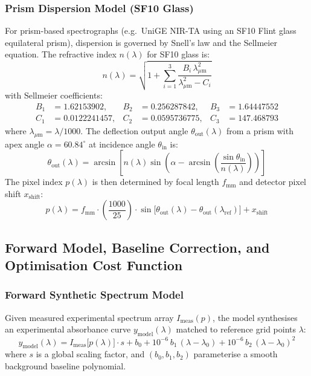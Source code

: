\subsubsection{Prism Dispersion Model (SF10 Glass)}
For prism-based spectrographs (e.g.\ UniGE NIR-TA using an SF10 Flint glass equilateral prism), dispersion is governed by Snell's law and the Sellmeier equation. The refractive index $n(\lambda)$ for SF10 glass is:
\begin{equation}\label{eq:sellmeier}
  n(\lambda) = \sqrt{1 + \sum_{i=1}^{3} \frac{B_i \, \lambda_{\mu\text{m}}^2}{\lambda_{\mu\text{m}}^2 - C_i}}
\end{equation}
with Sellmeier coefficients:
\begin{equation*}
  \begin{aligned}
    B_1 &= 1.62153902, & B_2 &= 0.256287842, & B_3 &= 1.64447552 \\
    C_1 &= 0.0122241457, & C_2 &= 0.0595736775, & C_3 &= 147.468793
  \end{aligned}
\end{equation*}
where $\lambda_{\mu\text{m}} = \lambda / 1000$. The deflection output angle $\theta_\text{out}(\lambda)$ from a prism with apex angle $\alpha = 60.84^\circ$ at incidence angle $\theta_\text{in}$ is:
\begin{equation}\label{eq:prism_angle}
  \theta_\text{out}(\lambda) = \arcsin\!\left[ n(\lambda) \sin\!\left( \alpha - \arcsin\!\left( \frac{\sin\theta_\text{in}}{n(\lambda)} \right) \right) \right]
\end{equation}
The pixel index $p(\lambda)$ is then determined by focal length $f_\text{mm}$ and detector pixel shift $x_\text{shift}$:
\begin{equation}\label{eq:prism_pixel}
  p(\lambda) = f_\text{mm} \cdot \left( \frac{1000}{25} \right) \cdot \sin\!\big[ \theta_\text{out}(\lambda) - \theta_\text{out}(\lambda_\text{ref}) \big] + x_\text{shift}
\end{equation}

\subsection{Forward Model, Baseline Correction, and Optimisation Cost Function}

\subsubsection{Forward Synthetic Spectrum Model}
Given measured experimental spectrum array $I_\text{meas}(p)$, the model synthesises an experimental absorbance curve $y_\text{model}(\lambda)$ matched to reference grid points $\lambda$:
\begin{equation}\label{eq:forward_model}
  y_\text{model}(\lambda) = I_\text{meas}\!\big[p(\lambda)\big] \cdot s + b_0 + 10^{-6} \, b_1 \, (\lambda - \lambda_0) + 10^{-6} \, b_2 \, (\lambda - \lambda_0)^2
\end{equation}
where $s$ is a global scaling factor, and $(b_0, b_1, b_2)$ parameterise a smooth background baseline polynomial.

